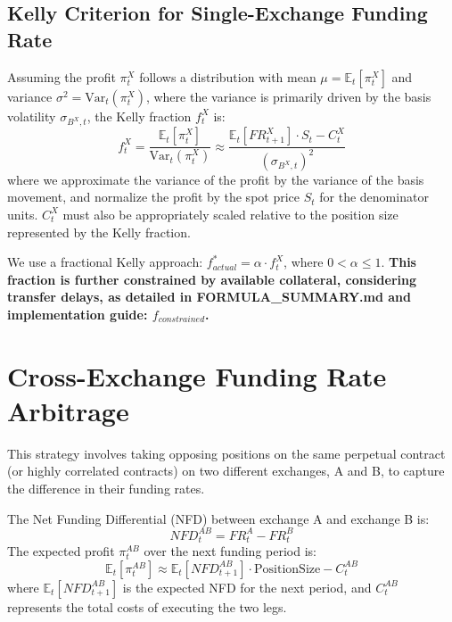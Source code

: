 \documentclass{article}
\begin{document}
\subsection{Kelly Criterion for Single-Exchange Funding Rate}

Assuming the profit $\pi^X_t$ follows a distribution with mean $\mu = \mathbb{E}_t[\pi^X_t]$ and variance $\sigma^2 = \text{Var}_t(\pi^X_t)$, where the variance is primarily driven by the basis volatility $\sigma_{B^X,t}$, the Kelly fraction $f^X_t$ is:
\begin{equation} \label{eq:kelly_basis_singleX_strat}
    f^X_t = \frac{\mathbb{E}_t[\pi^X_t]}{\text{Var}_t(\pi^X_t)} \approx \frac{\mathbb{E}_t[FR^X_{t+1}] \cdot S_t - C^X_t}{(\sigma_{B^X, t})^2}
\end{equation}
where we approximate the variance of the profit by the variance of the basis movement, and normalize the profit by the spot price $S_t$ for the denominator units. $C^X_t$ must also be appropriately scaled relative to the position size represented by the Kelly fraction.

We use a fractional Kelly approach: $f^*_{actual} = \alpha \cdot f^X_t$, where $0 < \alpha \le 1$. \textbf{This fraction is further constrained by available collateral, considering transfer delays, as detailed in FORMULA\_SUMMARY.md and implementation guide: $f_{constrained}$.}

\section{Cross-Exchange Funding Rate Arbitrage}

This strategy involves taking opposing positions on the same perpetual contract (or highly correlated contracts) on two different exchanges, A and B, to capture the difference in their funding rates.

The Net Funding Differential (NFD) between exchange A and exchange B is:
\begin{equation}
    NFD^{AB}_t = FR^A_t - FR^B_t
\end{equation}
The expected profit $\pi^{AB}_t$ over the next funding period is:
\begin{equation} \label{eq:profit_cross_strat}
    \mathbb{E}_t[\pi^{AB}_t] \approx \mathbb{E}_t[NFD^{AB}_{t+1}] \cdot \text{PositionSize} - C^{AB}_t
\end{equation}
where $\mathbb{E}_t[NFD^{AB}_{t+1}]$ is the expected NFD for the next period, and $C^{AB}_t$ represents the total costs of executing the two legs.
\end{document}

